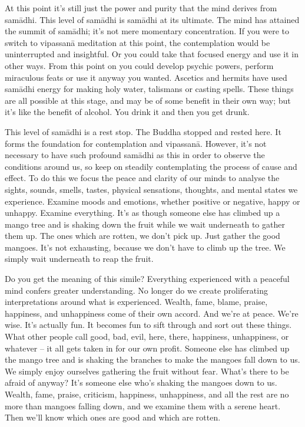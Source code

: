 At this point it's still just the power and purity that the mind derives from sam\=adhi. This level of sam\=adhi is sam\=adhi at its ultimate. The mind has attained the summit of sam\=adhi; it's not mere momentary concentration. If you were to switch to vipassan\=a meditation at this point, the contemplation would be uninterrupted and insightful. Or you could take that focused energy and use it in other ways. From this point on you could develop psychic powers, perform miraculous feats or use it anyway you wanted. Ascetics and hermits have used sam\=adhi energy for making holy water, talismans or casting spells. These things are all possible at this stage, and may be of some benefit in their own way; but it's like the benefit of alcohol. You drink it and then you get drunk.

This level of sam\=adhi is a rest stop. The Buddha stopped and rested here. It forms the foundation for contemplation and vipassan\=a. However, it's not necessary to have such profound sam\=adhi as this in order to observe the conditions around us, so keep on steadily contemplating the process of cause and effect. To do this we focus the peace and clarity of our minds to analyse the sights, sounds, smells, tastes, physical sensations, thoughts, and mental states we experience. Examine moods and emotions, whether positive or negative, happy or unhappy. Examine everything. It's as though someone else has climbed up a mango tree and is shaking down the fruit while we wait underneath to gather them up. The ones which are rotten, we don't pick up. Just gather the good mangoes. It's not exhausting, because we don't have to climb up the tree. We simply wait underneath to reap the fruit.

Do you get the meaning of this simile? Everything experienced with a peaceful mind confers greater understanding. No longer do we create proliferating interpretations around what is experienced. Wealth, fame, blame, praise, happiness, and unhappiness come of their own accord. And we're at peace. We're wise. It's actually fun. It becomes fun to sift through and sort out these things. What other people call good, bad, evil, here, there, happiness, unhappiness, or whatever -- it all gets taken in for our own profit. Someone else has climbed up the mango tree and is shaking the branches to make the mangoes fall down to us. We simply enjoy ourselves gathering the fruit without fear. What's there to be afraid of anyway? It's someone else who's shaking the mangoes down to us. Wealth, fame, praise, criticism, happiness, unhappiness, and all the rest are no more than mangoes falling down, and we examine them with a serene heart. Then we'll know which ones are good and which are rotten.

